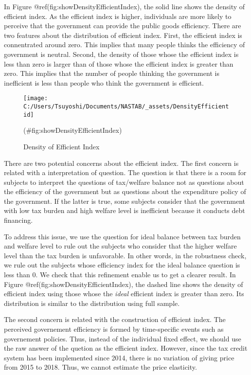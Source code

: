 \documentclass[
]{article}
\begin{document}
In Figure @ref(fig:showDensityEfficientIndex), the solid line shows the density of efficient index.
As the efficient index is higher,
individuals are more likely to perceive that the government can provide the public goods efficiency.
There are two features about the distribution of efficient index.
First, the efficient index is connentrated around zero.
This implies that many people thinks the efficiency of government is neutral.
Second, the density of those whose the efficient index is less than zero is larger than of
those whose the efficient index is greater than zero.
This implies that the number of people thinking the government is inefficient is
less than people who think the government is efficient.

\begin{figure}[t]

{\centering \texttt{[image: C:/Users/Tsuyoshi/Documents/NASTAB/\_assets/DensityEfficientid]} 

}

\caption{Density of Efficient Index}(\#fig:showDensityEfficientIndex)
\end{figure}

There are two potential concerns about the efficient index.
The first concern is related with a interpretation of question.
The question is that
there is a room for subjects to interpret the questions of tax/welfare balance
not as questions about the efficiency of the government
but as questions about the expenditure policy of the government.
If the latter is true,
some subjects consider that the government with low tax burden and high welfare level is inefficient because
it conducts debt financing.

To address this issue,
we use the question for ideal balance between tax burden and welfare level
to rule out the subjects who consider that the higher welfare level than the tax burden is unfavorable.
In other words, in the robustness check,
we rule out the subjects whose efficiency index for the ideal balance question is less than 0.
We check that this refinement enable us to get a clearer result.
In Figure @ref(fig:showDensityEfficientIndex),
the dashed line shows the density of efficient index
using those whose the \emph{ideal} efficient index is greater than zero.
Its distribution is similar to the distribution using full sample.

The second concern is related with the construction of efficient index.
The perceived governement efficiency is formed by time-specific events such as governement policies.
Thus, instead of the individual fixed effect,
we should use the raw answer of the quetion as the efficient index.
However, since the tax credit system has been implemented since 2014,
there is no variation of giving price from 2015 to 2018.
Thus, we cannot estimate the price elasticity.
\end{document}
